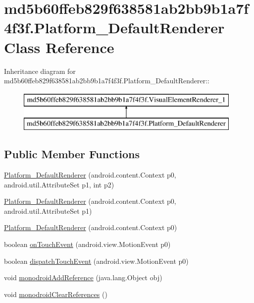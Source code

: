 \hypertarget{classmd5b60ffeb829f638581ab2bb9b1a7f4f3f_1_1_platform___default_renderer}{
\section{md5b60ffeb829f638581ab2bb9b1a7f4f3f.Platform\_\-DefaultRenderer Class Reference}
\label{classmd5b60ffeb829f638581ab2bb9b1a7f4f3f_1_1_platform___default_renderer}
}
Inheritance diagram for md5b60ffeb829f638581ab2bb9b1a7f4f3f.Platform\_\-DefaultRenderer::\begin{figure}[H]
\begin{center}
\leavevmode
\includegraphics[height=2cm]{classmd5b60ffeb829f638581ab2bb9b1a7f4f3f_1_1_platform___default_renderer}
\end{center}
\end{figure}
\subsection*{Public Member Functions}
\begin{CompactItemize}
\item 
\hyperlink{classmd5b60ffeb829f638581ab2bb9b1a7f4f3f_1_1_platform___default_renderer_eafd2a9469465843c186a31ab7c6f1fa}{Platform\_\-DefaultRenderer} (android.content.Context p0, android.util.AttributeSet p1, int p2)
\item 
\hyperlink{classmd5b60ffeb829f638581ab2bb9b1a7f4f3f_1_1_platform___default_renderer_bbbf33e1c50423f6b442efed5224ebec}{Platform\_\-DefaultRenderer} (android.content.Context p0, android.util.AttributeSet p1)
\item 
\hyperlink{classmd5b60ffeb829f638581ab2bb9b1a7f4f3f_1_1_platform___default_renderer_3e7015303f57b219dad7b8abd32e2070}{Platform\_\-DefaultRenderer} (android.content.Context p0)
\item 
boolean \hyperlink{classmd5b60ffeb829f638581ab2bb9b1a7f4f3f_1_1_platform___default_renderer_07ccce17539adcbc1b97fbfc02107560}{onTouchEvent} (android.view.MotionEvent p0)
\item 
boolean \hyperlink{classmd5b60ffeb829f638581ab2bb9b1a7f4f3f_1_1_platform___default_renderer_c2385d55d3936317073c71eb3232886e}{dispatchTouchEvent} (android.view.MotionEvent p0)
\item 
void \hyperlink{classmd5b60ffeb829f638581ab2bb9b1a7f4f3f_1_1_platform___default_renderer_799e1dac7b8eb2dce35fe56b86695b9d}{monodroidAddReference} (java.lang.Object obj)
\item 
void \hyperlink{classmd5b60ffeb829f638581ab2bb9b1a7f4f3f_1_1_platform___default_renderer_27a3fcd4a55447ba5df4a3eef8c52982}{monodroidClearReferences} ()
\end{CompactItemize}
